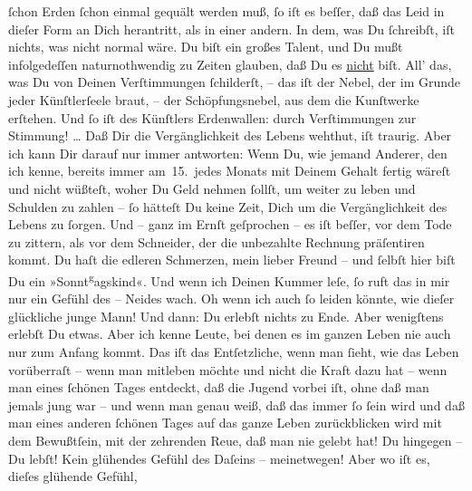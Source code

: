 \begin{ledgroupsized}[t]{13cm}
{                  ſchon} Erden ſchon einmal gequält werden muß, ſo iſt es beſſer, daß das Leid
               in dieſer Form an Dich herantritt, als in einer andern. In dem, was Du
               ſchreibſt, iſt nichts, was nicht normal wäre. Du biſt ein großes Talent, und Du mußt
               infolgedeſſen naturnothwendig zu Zeiten glauben, daß Du es \uline{nicht} biſt. All’ das, was Du von Deinen Verſtimmungen ſchilderſt, – das iſt
               der  Nebel, der im Grunde jeder Künſtlerſeele
               braut,  – der Schöpfungsnebel, aus dem die
               Kunſtwerke erſtehen. Und ſo iſt des Künſtlers Erdenwallen: durch Verſtimmungen zur
               Stimmung! {\dots} Daß Dir {\pb}die
               Vergänglichkeit des Lebens wehthut, iſt traurig. Aber ich kann Dir darauf nur immer
               antworten: Wenn Du, wie jemand Anderer, den ich kenne, bereits immer am 15. jedes
               Monats mit Deinem Gehalt fertig wäreſt und nicht wüßteſt, woher Du Geld nehmen
               ſollſt, um weiter zu leben und Schulden zu zahlen – ſo hätteſt Du keine Zeit, Dich um
               die Vergänglichkeit des Lebens zu ſorgen. Und – ganz im Ernſt geſprochen – es iſt
               beſſer, vor dem Tode zu zittern, als vor {\pb}dem
               Schneider, der die unbezahlte Rechnung präſentiren kommt. Du haſt die edleren
               Schmerzen, mein lieber Freund – und ſelbſt hier biſt Du ein »Sonnt\substVorne{}\textsuperscript{g}\substDazwischen{}a\substHinten{}gskind«. Und wenn ich Deinen Kummer leſe, ſo ruft das in mir nur ein Gefühl
               des – Neides wach. Oh wenn ich auch ſo  leiden
               könnte, wie dieſer glückliche junge Mann! Und dann: Du erlebſt nichts zu Ende. Aber
               wenigſtens erlebſt Du etwas. Aber ich kenne {\pb}Leute,
               bei  denen es im ganzen Leben nie auch nur zum
               Anfang kommt. Das iſt das Entſetzliche, wenn man ſieht, wie das Leben vorüberraſt –
               wenn man mitleben möchte und nicht die Kraft dazu hat – wenn man eines ſchönen Tages
                   entdeckt, daß die Jugend vorbei iſt, ohne daß
               man jemals jung war – und wenn man genau weiß, daß das immer ſo ſein wird und daß man
               eines  anderen ſchönen Tages auf das {\pb}ganze Leben zurückblicken wird mit dem Bewußtſein,
               mit der zehrenden Reue, daß man nie gelebt hat! Du hingegen – Du lebſt! Kein
               glühendes Gefühl des Daſeins – meinetwegen! Aber wo iſt es, dieſes glühende Gefühl,

\end{ledgroupsized}

